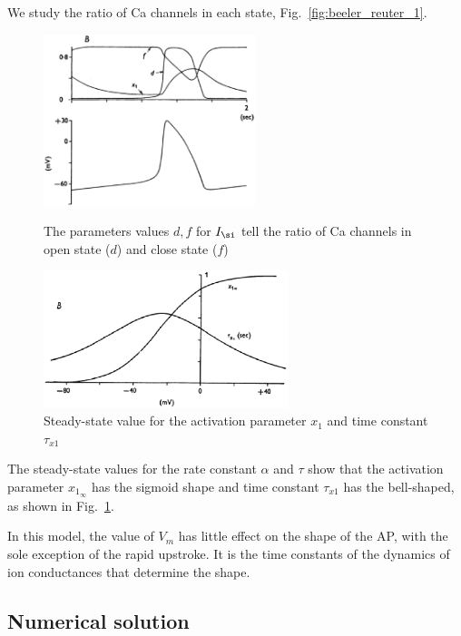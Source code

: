 We study the ratio of Ca channels in each state,
Fig.~\ref{fig:beeler_reuter_1}.
\begin{figure}[!hbt]
  \begin{minipage}[b]{0.5\linewidth}
    \centering
    \includegraphics[height=5cm,
    angle=0]{./images/beeler_reuter_1.eps}
    \caption{The parameters values $d,f$ for $I_\si$ tell the ratio of
      Ca channels in open state ($d$) and close state ($f$)}
    \label{fig:beeler_reuter_1}
\end{minipage}
\hspace{0.5cm}
\begin{minipage}[b]{0.5\linewidth}
    \centering
  \includegraphics[height=4cm,
  angle=0]{./images/beeler_reuter_4.eps}
\caption{Steady-state value for the activation parameter $x_1$ and
  time constant $\tau_{x1}$}
\label{fig:beeler_reuter_4}
  \end{minipage}
\end{figure}

The steady-state values for the rate constant $\alpha$ and $\tau$ show
that the activation parameter $x_{1_\infty}$ has the sigmoid shape and
time constant $\tau_{x1}$ has the bell-shaped, as shown in
Fig.~\ref{fig:beeler_reuter_4}.

In this model, the value of $V_m$ has little effect on the shape of
the AP, with the sole exception of the rapid upstroke. It is the time
constants of the dynamics of ion conductances that determine the
shape.

\subsection{Numerical solution}
\label{sec:numerical-solution-2}

